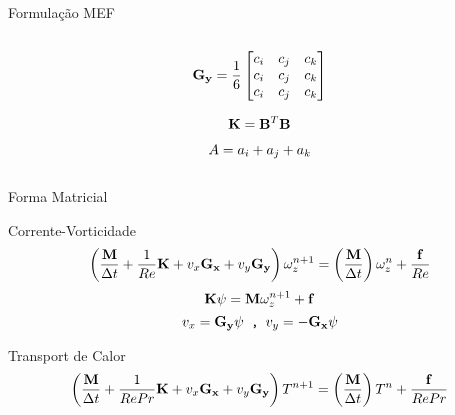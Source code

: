 \documentclass{beamer}
\begin{document}
\begin{frame}{Formulação MEF}
\begin{columns}
\begin{column}{0.5\textwidth}
{			\begin{equation}
			\mathbf{G_y} = \frac{1}{6}
				\begin{bmatrix}
					c_i & c_j & c_k    \\
					c_i & c_j & c_k    \\
					c_i & c_j & c_k    
					\end{bmatrix}\notag
			\end{equation}			

			\begin{equation}
			\mathbf{K} = \mathbf{B}^T\mathbf{B} \notag 
			\end{equation}	

			\begin{equation}
			A = a_i +a_j+a_k \notag 
			\end{equation}			}		

			\end{column}
		\end{columns}     
    \end{frame}


    \begin{frame}{Forma Matricial}
		\begin{block}{Corrente-Vorticidade}
			\begin{equation}
				\left( \frac{\mathbf{M}}{\Delta t}  + \frac{1}{Re}\mathbf{K} +  v_x\mathbf{G_x} + v_y\mathbf{G_y}  \right) \omega_z^{n+1} = \left( \frac{\mathbf{M}}{\Delta t} \right) \omega_z^n  + \frac{\mathbf{f}}{Re} \notag 
			\end{equation}	
			\begin{equation}
				\mathbf{K}\psi = \mathbf{M} \omega_z^{n+1} + \mathbf{f}\notag 
			\end{equation}				
			\begin{equation}
				v_x = \mathbf{G_y} \psi  \texttt{  ,  }   v_y = - \mathbf{G_x}\psi\notag 
			\end{equation}
			\end{block}	
			\begin{block}{Transport de Calor}
			\begin{equation}
				\left( \frac{\mathbf{M}}{\Delta t}  + \frac{1}{RePr}\mathbf{K} +  v_x\mathbf{G_x} + v_y\mathbf{G_y}  \right) T^{n+1} = \left( \frac{\mathbf{M}}{\Delta t} \right) T^n  + \frac{\mathbf{f}}{RePr} \notag 
			\end{equation}			
		\end{block}	 	
	 \end{frame}
\end{document}
